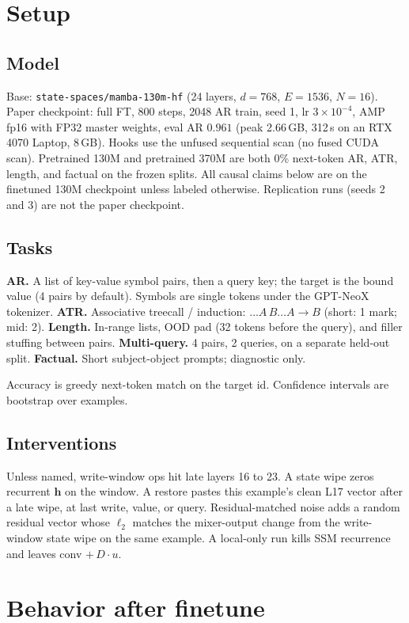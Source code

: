 \documentclass[11pt]{article}
\begin{document}
\section{Setup}

\subsection{Model}
Base: \texttt{state-spaces/mamba-130m-hf} (24 layers, $d=768$, $E=1536$,
$N=16$).
Paper checkpoint: full FT, 800 steps, 2048 AR train, seed 1, lr
$3\times 10^{-4}$, AMP fp16 with FP32 master weights, eval AR $0.961$
(peak 2.66\,GB, 312\,s on an RTX 4070 Laptop, 8\,GB).
Hooks use the unfused sequential scan (no fused CUDA scan).
Pretrained 130M and pretrained 370M are both $0\%$ next-token AR, ATR,
length, and factual on the frozen splits.
All causal claims below are on the finetuned 130M checkpoint unless
labeled otherwise.
Replication runs (seeds 2 and 3) are not the paper checkpoint.

\subsection{Tasks}
\textbf{AR.} A list of key-value symbol pairs, then a query key; the
target is the bound value (4 pairs by default).
Symbols are single tokens under the GPT-NeoX tokenizer.
\textbf{ATR.} Associative treecall / induction:
$\ldots A\, B \ldots A \to B$ (short: 1 mark; mid: 2).
\textbf{Length.} In-range lists, OOD pad (32 tokens before the query),
and filler stuffing between pairs.
\textbf{Multi-query.} 4 pairs, 2 queries, on a separate held-out split.
\textbf{Factual.} Short subject-object prompts; diagnostic only.

Accuracy is greedy next-token match on the target id.
Confidence intervals are bootstrap over examples.

\subsection{Interventions}
Unless named, write-window ops hit late layers 16 to 23.
A state wipe zeros recurrent $\mathbf{h}$ on the window.
A restore pastes this example's clean L17 vector after a late wipe, at
last write, value, or query.
Residual-matched noise adds a random residual vector whose $\ell_2$
matches the mixer-output change from the write-window state wipe on the
same example.
A local-only run kills SSM recurrence and leaves conv $+\,D\cdot u$.

\section{Behavior after finetune}
\end{document}
